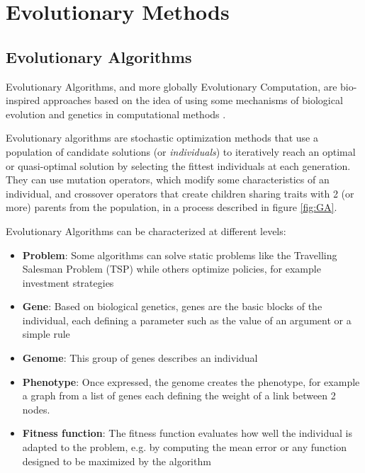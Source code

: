 \chapter{Evolutionary Methods }
\label{chap:evo}

\section{Evolutionary Algorithms}

Evolutionary Algorithms, and more globally Evolutionary Computation, are bio-inspired approaches based on the idea of using some mechanisms of biological evolution \cite{origin-of-species} and genetics \cite{genetics} in computational methods \cite{introduction-ga}. 

Evolutionary algorithms are stochastic optimization methods that use a population of candidate solutions (or \textit{individuals}) to iteratively reach an optimal or quasi-optimal solution by selecting the fittest individuals at each generation. They can use mutation operators, which modify some characteristics of an individual, and crossover operators that create children sharing traits with 2 (or more) parents from the population, in a process described in figure \ref{fig:GA}.

Evolutionary Algorithms can be characterized at different levels:
\begin{itemize}
    \item \textbf{Problem}: Some algorithms can solve static problems like the Travelling Salesman Problem (TSP) while others optimize policies, for example investment strategies 
    \item \textbf{Gene}: Based on biological genetics, genes are the basic blocks of the individual, each defining a parameter such as the value of an argument or a simple rule
    \item \textbf{Genome}: This group of genes describes an individual 
    \item \textbf{Phenotype}: Once expressed, the genome creates the phenotype, for example a graph from a list of genes each defining the weight of a link between 2 nodes.
    \item \textbf{Fitness function}: The fitness function evaluates how well the individual is adapted to the problem, e.g. by computing the mean error or any function designed to be maximized by the algorithm
\end{itemize}

